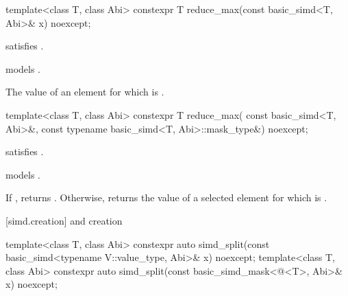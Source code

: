 \begin{itemdecl}
template<class T, class Abi> constexpr T reduce_max(const basic_simd<T, Abi>& x) noexcept;
\end{itemdecl}

\begin{itemdescr}
  \pnum\constraints
   satisfies .

  \pnum\expects
   models .

  \pnum\returns
  The value of an element  for which  is  \foralli.
\end{itemdescr}

\begin{itemdecl}
template<class T, class Abi>
  constexpr T reduce_max(
    const basic_simd<T, Abi>&, const typename basic_simd<T, Abi>::mask_type&) noexcept;
\end{itemdecl}

\begin{itemdescr}
  \pnum\constraints
   satisfies .

  \pnum\expects
   models .

  \pnum\returns
  If , returns .
  Otherwise, returns the value of a selected element  for which  is  \forallmaskedi.
\end{itemdescr}

[simd.creation]{ and  creation}

\begin{itemdecl}
template<class T, class Abi>
  constexpr auto simd_split(const basic_simd<typename V::value_type, Abi>& x) noexcept;
template<class T, class Abi>
  constexpr auto simd_split(const basic_simd_mask<@\maskelementsize@<T>, Abi>& x) noexcept;
\end{itemdecl}

